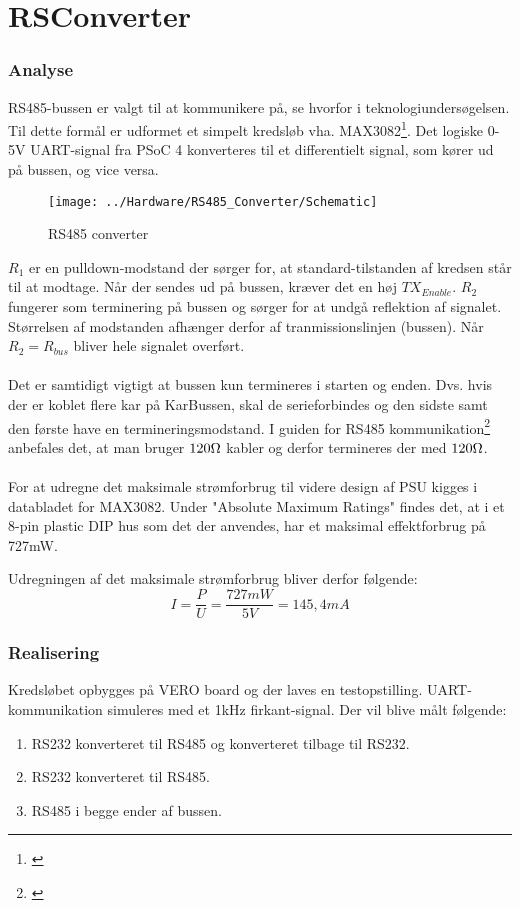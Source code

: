 \section{RSConverter}
\subsubsection{Analyse}
RS485-bussen er valgt til at kommunikere på, se hvorfor i teknologiundersøgelsen. Til dette formål er udformet et simpelt kredsløb vha. MAX3082\footnote{\citet{mi:MAX3082}}. Det logiske 0-5V UART-signal fra PSoC 4 konverteres til et differentielt signal, som kører ud på bussen, og vice versa.

\begin{figure}[H]
	\centering
	\texttt{[image: ../Hardware/RS485\_Converter/Schematic]}
	\caption{RS485 converter}
	\label{photo:RS485converter}
\end{figure}

$R_1$ er en pulldown-modstand der sørger for, at standard-tilstanden af kredsen står til at modtage. Når der sendes ud på bussen, kræver det en høj $TX_{Enable}$. $R_2$ fungerer som terminering på bussen og sørger for at undgå reflektion af signalet. Størrelsen af modstanden afhænger derfor af tranmissionslinjen (bussen). Når $R_2 = R_{bus}$ bliver hele signalet overført. 
\\\\
Det er samtidigt vigtigt at bussen kun termineres i starten og enden. Dvs. hvis der er koblet flere kar på KarBussen, skal de serieforbindes og den sidste samt den første have en termineringsmodstand. I guiden for RS485 kommunikation\footnote{\citet{ti:rs485}} anbefales det, at man bruger $120\ohm$ kabler og derfor termineres der med $120\ohm$. 
\\\\
For at udregne det maksimale strømforbrug til videre design af PSU kigges i databladet for MAX3082. Under "Absolute Maximum Ratings" findes det, at i et 8-pin plastic DIP hus som det der anvendes, har et maksimal effektforbrug på 727mW.

Udregningen af det maksimale strømforbrug bliver derfor følgende:
\begin{equation}
	I = \frac{P}{U} = \frac{727mW}{5V} = 145,4mA
\end{equation}


\subsubsection{Realisering}
Kredsløbet opbygges på VERO board og der laves en testopstilling. UART-kommunikation simuleres med et 1kHz firkant-signal. Der vil blive målt følgende:
\begin{enumerate}
\item RS232 konverteret til RS485 og konverteret tilbage til RS232.
\item RS232 konverteret til RS485.
\item RS485 i begge ender af bussen.
\end{enumerate}


